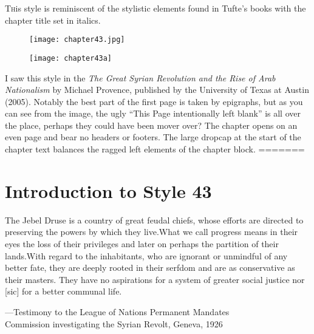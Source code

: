 \lettrine{T}his style is reminiscent of the stylistic elements found in Tufte's books with the chapter title set in italics.
\begin{figure}[ht]
\centering
\texttt{[image: chapter43.jpg]}\par
\texttt{[image: chapter43a]}
\end{figure}
I saw this style in the \textit{The Great Syrian Revolution and the Rise of Arab Nationalism} by Michael Provence, published by the University of Texas at Austin (2005). Notably the best part of the first page is taken by epigraphs, but as you can see from the image, the ugly ``This Page intentionally left blank'' is all over the place, perhaps they could have been mover over? The chapter opens on an even page and bear no headers or footers. The large dropcap at the start of the chapter text balances the ragged left elements of the chapter block.
\lipsum
=======






\chapter{Introduction to Style 43}

\epigraph{The Jebel Druse is a country of great feudal chiefs, whose efforts are
directed to preserving the powers by which they live.What we call
progress means in their eyes the loss of their privileges and later on
perhaps the partition of their lands.With regard to the inhabitants,
who are ignorant or unmindful of any better fate, they are deeply rooted
in their serfdom and are as conservative as their masters. They have no
aspirations for a system of greater social justice nor [sic] for a better
communal life.}{---Testimony to the League of Nations Permanent Mandates\\
Commission investigating the Syrian Revolt, Geneva, 1926}

